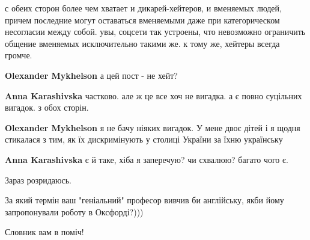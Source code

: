 \begin{itemize}
с обеих сторон более чем хватает и дикарей-хейтеров, и вменяемых людей, причем
последние могут оставаться вменяемыми даже при категорическом несогласии между
собой. увы, соцсети так устроены, что невозможно ограничить общение вменяемых
исключительно такими же. к тому же, хейтеры всегда громче.

\begin{itemize}
 
\textbf{Olexander Mykhelson} а цей пост - не хейт?

 

\textbf{Anna Karashivska} частково. але ж це все хоч не вигадка. а є повно суцільних вигадок. з обох сторін.

 
\textbf{Olexander Mykhelson} я не бачу ніяких вигадок. У мене двоє дітей і я щодня стикалася з тим, як їх дискримінують у столиці України за їхню українську

 

\textbf{Anna Karashivska} є й таке, хіба я заперечую? чи схвалюю? багато чого є.
\end{itemize}

 
Зараз розридаюсь.

За який термін ваш "геніальний" професор вивчив би англійську, якби йому
запропонували роботу в Оксфорді?)))

Словник вам в поміч!


\end{itemize}
